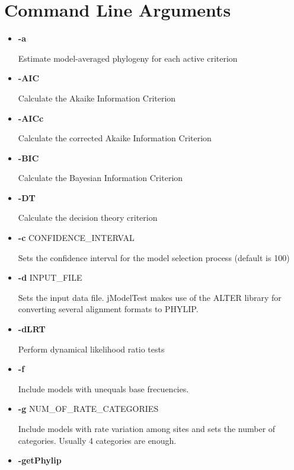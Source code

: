 \documentclass[11pt,twoside,a4paper]{article}
\begin{document}

\section{Command Line Arguments}

\begin{itemize}

\item  {\bf -a}

Estimate model-averaged phylogeny for each active criterion

\item  {\bf -AIC}

Calculate the Akaike Information Criterion

\item  {\bf -AICc}

Calculate the corrected Akaike Information Criterion

\item  {\bf -BIC}

Calculate the Bayesian Information Criterion

\item  {\bf -DT}

Calculate the decision theory criterion

\item  {\bf -c} CONFIDENCE\_INTERVAL

Sets the confidence interval for the model selection process (default is 100)

\item  {\bf -d} INPUT\_FILE

Sets the input data file. jModelTest makes use of the ALTER library for converting several alignment formats to PHYLIP.

\item  {\bf -dLRT}

Perform dynamical likelihood ratio tests

\item  {\bf -f}

Include models with unequals base frecuencies.

\item  {\bf -g} NUM\_OF\_RATE\_CATEGORIES

Include models with rate variation among sites and sets the number of categories. Usually 4 categories are enough.

\item  {\bf -getPhylip}


\end{itemize}
\end{document}
